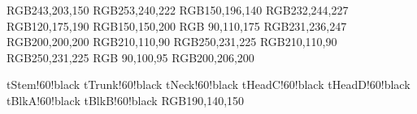 \definecolor{tStem}   {RGB}{243,203,150}  %
\definecolor{tStemP}  {RGB}{253,240,222}  %
\definecolor{tTrunk}  {RGB}{150,196,140}  %
\definecolor{tTrunkP} {RGB}{232,244,227}  %
\definecolor{tBlkA}   {RGB}{120,175,190}  %
\definecolor{tBlkB}   {RGB}{150,150,200}  %
\definecolor{tNeck}   {RGB}{ 90,110,175}  %
\definecolor{tNeckP}  {RGB}{231,236,247}  %
\definecolor{tStruct} {RGB}{200,200,200}  %
\definecolor{tHeadC}  {RGB}{210,110,90}   %
\definecolor{tHeadCP} {RGB}{250,231,225}  %
\definecolor{tHeadD}  {RGB}{210,110,90}   %
\definecolor{tHeadDP} {RGB}{250,231,225}  %
\definecolor{tLine}   {RGB}{ 90,100,95}   %
\definecolor{tRule}   {RGB}{200,206,200}  %

  {tStem!60!black}
 {tTrunk!60!black}
  {tNeck!60!black}
 {tHeadC!60!black}
 {tHeadD!60!black}
  {tBlkA!60!black}
  {tBlkB!60!black}
\definecolor{tBlkSum} {RGB}{190,140,150}  %
